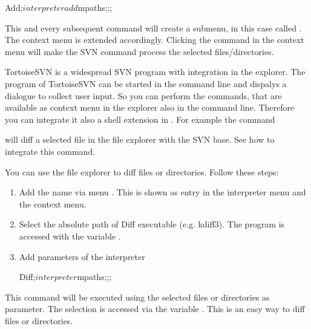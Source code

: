 \begin{code}
 Add;$interpreter add $mpaths;;;
\end{code}

This and every subsequent command will create a submenu, in this case called . The context menu is extended accordingly. Clicking the command in the context menu will make the SVN command  process the selected files/directories.

TortoiseSVN is a widespread SVN program with integration in the explorer. The program  of TortoiseSVN can be started in the command line and dispalys a dialogue to collect user input. So you can perform the commands, that are available as context menu in the explorer also in the command line. Therefore you can integrate it also a shell extension in \codeblocks. For example the command


will diff a selected file in the \codeblocks file explorer with the SVN base. See  how to integrate this command.



You can use the file explorer to diff files or directories. Follow these steps:

\begin{enumerate}
\item Add the name via menu . This is shown as entry in the interpreter menu and the context menu.
\item Select the absolute path of Diff executable (e.g. kdiff3). The program is accessed with the variable .
\item Add parameters of the interpreter
\begin{cmd}
Diff;$interpreter $mpaths;;;
\end{cmd}
\end{enumerate}

This command will be executed using the selected files or directories as parameter. The selection is accessed via the variable . This is an easy way to diff files or directories.

